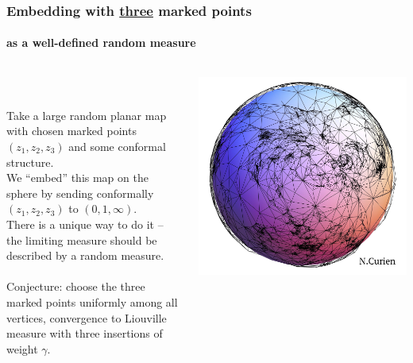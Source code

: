 \documentclass[aspectratio=169]{beamer}
\begin{document}
\begin{frame}
\frametitle{Embedding with \underline{three} marked points}
\framesubtitle{as a well-defined random measure}
\begin{columns}[T]
\begin{column}{.54\textwidth}
~\\
~\\
Take a large random planar map with chosen marked points $(z_1,z_2,z_3)$ and some conformal structure.\\
We ``embed'' this map on the sphere by sending conformally $(z_1,z_2,z_3)$ to $(0,1,\infty)$.\\
There is a unique way to do it -- the limiting measure should be described by a random measure.\\
~\\
Conjecture: choose the three marked points uniformly among all vertices, convergence to Liouville measure with three insertions of weight $\gamma$.
\end{column}
\begin{column}{.44\textwidth}
\includegraphics[width=\textwidth]{nc.jpg}
\end{column}
\end{columns}
\end{frame}
\end{document}
